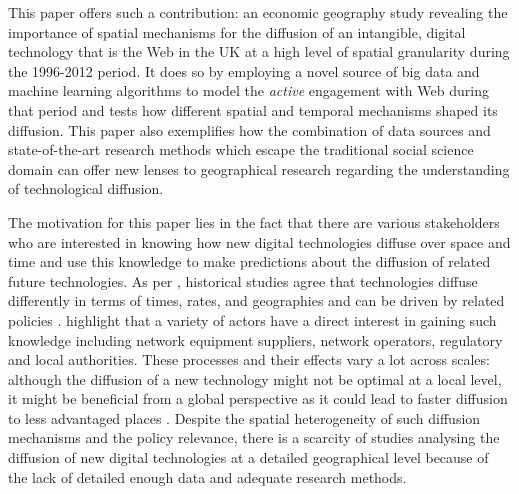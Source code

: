 \documentclass[
  authoryear,
  preprint,
  3p]{elsarticle}
\begin{document}
This paper offers such a contribution: an economic geography study
revealing the importance of spatial mechanisms for the diffusion of an
intangible, digital technology that is the Web in the UK at a high level
of spatial granularity during the 1996-2012 period. It does so by
employing a novel source of big data and machine learning algorithms to
model the \emph{active} engagement with Web during that period and tests
how different spatial and temporal mechanisms shaped its diffusion. This
paper also exemplifies how the combination of data sources and
state-of-the-art research methods which escape the traditional social
science domain can offer new lenses to geographical research regarding
the understanding of technological diffusion.

The motivation for this paper lies in the fact that there are various
stakeholders who are interested in knowing how new digital technologies
diffuse over space and time and use this knowledge to make predictions
about the diffusion of related future technologies. As per
\citet{leibowicz2016representing}, historical studies agree that
technologies diffuse differently in terms of times, rates, and
geographies and can be driven by related policies \citep{victor1993}.
\citet{meade2021modelling} highlight that a variety of actors have a
direct interest in gaining such knowledge including network equipment
suppliers, network operators, regulatory and local authorities. These
processes and their effects vary a lot across scales: although the
diffusion of a new technology might not be optimal at a local level, it
might be beneficial from a global perspective as it could lead to faster
diffusion to less advantaged places \citep{leibowicz2016representing}.
Despite the spatial heterogeneity of such diffusion mechanisms and the
policy relevance, there is a scarcity of studies analysing the diffusion
of new digital technologies at a detailed geographical level because of
the lack of detailed enough data and adequate research methods.
\end{document}
